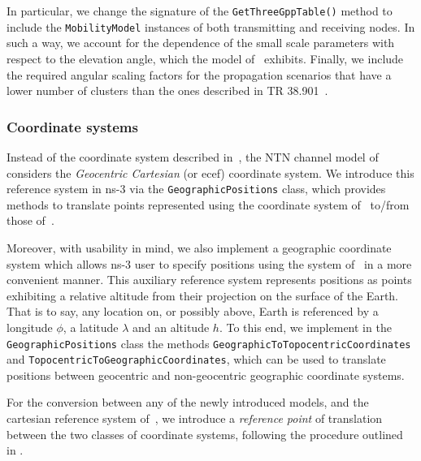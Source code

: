 In particular, we change the signature of the \texttt{GetThreeGppTable()} method to include the \texttt{Mobility\-Model} instances of both transmitting and receiving nodes. In such a way, we account for the dependence of the small scale parameters with respect to the elevation angle, which the model of~\cite{38811} exhibits.
Finally, we include the required angular scaling factors for the propagation scenarios that have a lower number of clusters than the ones described in TR 38.901~\cite{TR38901}.

\subsubsection{Coordinate systems}
Instead of the coordinate system described in~\cite{TR38901}, the NTN channel model of~\cite{38811} considers the \emph{Geocentric Cartesian} (or \gls{ecef}) coordinate system.
We introduce this reference system in ns-3 via the \texttt{Geographic\-Positions} class, which provides methods to translate points represented using the coordinate system of~\cite{TR38901} to/from those of~\cite{38811}. 

Moreover, with usability in mind, we also implement a geographic coordinate system which allows ns-3 user to specify positions using the system of~\cite{38811} in a more convenient manner. This auxiliary reference system represents positions as points exhibiting a relative altitude from their projection on the surface of the Earth. That is to say, any location on, or possibly above, Earth is referenced by a longitude $\phi$, a latitude $\lambda$ and an altitude $h$. 
To this end, we implement in the \texttt{Geographic\-Positions} class the methods \texttt{Geographic\-To\-Topocentric\-Coordinates} and \texttt{Topocentric\-To\-Geographic\-Coordinates}, which can be used to translate positions between geocentric and non-geocentric geographic coordinate systems.

For the conversion between any of the newly introduced models, and the cartesian reference system of~\cite{TR38901}, we introduce a \emph{reference point} of translation between the two classes of coordinate systems, following the procedure outlined in \cite[Ch.~4]{coordinateconversion}.

